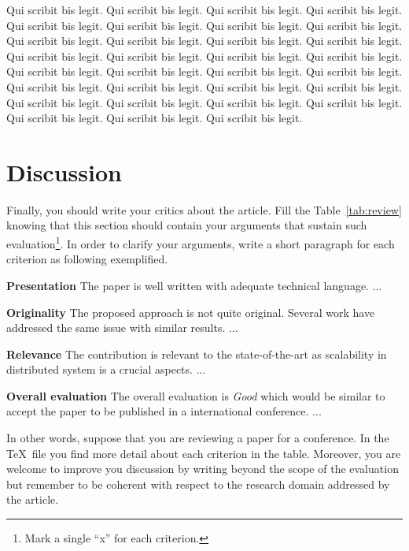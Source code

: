 \documentclass[conference]{IEEEtran}
\begin{document}
Qui scribit bis legit. Qui scribit bis legit. Qui scribit bis legit. Qui scribit bis legit. Qui scribit bis legit. Qui scribit bis legit. Qui scribit bis legit. Qui scribit bis legit. Qui scribit bis legit. Qui scribit bis legit. Qui scribit bis legit. Qui scribit bis legit. Qui scribit bis legit. Qui scribit bis legit. Qui scribit bis legit. Qui scribit bis legit. Qui scribit bis legit. Qui scribit bis legit. Qui scribit bis legit. Qui scribit bis legit. Qui scribit bis legit. Qui scribit bis legit. Qui scribit bis legit. Qui scribit bis legit. Qui scribit bis legit. Qui scribit bis legit. Qui scribit bis legit. Qui scribit bis legit. Qui scribit bis legit. Qui scribit bis legit. Qui scribit bis legit.

% 
% 
% 
% 
\section{Discussion}
\label{sec:discuss}

Finally, you should write your critics about the article. Fill the Table~\ref{tab:review} knowing that this section should contain your arguments that sustain such evaluation\footnote{Mark a single ``x'' for each criterion.}. In order to clarify your arguments, write a short paragraph for each criterion as following exemplified.

\textbf{Presentation} The paper is well written with adequate technical language. ...

\textbf{Originality} The proposed approach is not quite original. Several work have addressed the same issue with similar results. ...

\textbf{Relevance} The contribution is relevant to the state-of-the-art as scalability in distributed system is a crucial aspects. ...

\textbf{Overall evaluation} The overall evaluation is \emph{Good} which would be similar to accept the paper to be published in a international conference. ...

In other words, suppose that you are reviewing a paper for a conference. In the \TeX~file you find more detail about each criterion in the table. Moreover, you are welcome to improve you discussion by writing beyond the scope of the evaluation but remember to be coherent with respect to the research domain addressed by the article.
\end{document}
